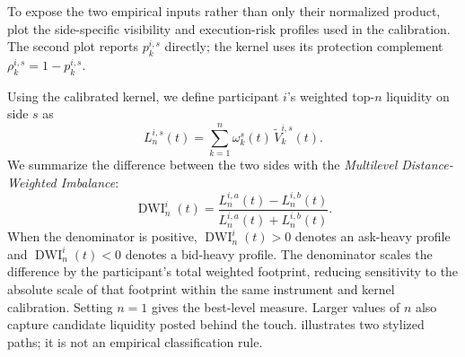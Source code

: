 \documentclass[11pt]{article}
\begin{document}
To expose the two empirical inputs rather than only their normalized product,
 plot the side-specific
visibility and execution-risk profiles used in the calibration. The second plot reports $p_k^{i,s}$ directly; the
kernel uses its protection complement $\rho_k^{i,s}=1-p_k^{i,s}$.


\FloatBarrier

Using the calibrated kernel, we define participant $i$'s weighted top-$n$ liquidity on side $s$ as
\begin{equation}
    L^{i,s}_{n}(t)
    =
    \sum_{k=1}^{n}
    \omega^{s}_{k}(t)\,\widetilde V^{i,s}_{k}(t).
    \label{eq:weighted_topn_liquidity}
\end{equation}
We summarize the difference between the two sides with the \textit{Multilevel Distance-Weighted Imbalance}:
\begin{equation}
    \operatorname{DWI}^{i}_{n}(t)
    =
    \frac{
        L^{i,a}_{n}(t)-L^{i,b}_{n}(t)
    }{
        L^{i,a}_{n}(t)+L^{i,b}_{n}(t)
    }.
    \label{eq:multilevel_dwi}
\end{equation}
When the denominator is positive, $\operatorname{DWI}^{i}_{n}(t)>0$ denotes an ask-heavy profile and
$\operatorname{DWI}^{i}_{n}(t)<0$ denotes a bid-heavy profile. The denominator scales the difference by the participant's
total weighted footprint, reducing sensitivity to the absolute scale of that footprint within the same instrument and
kernel calibration. Setting $n=1$ gives the best-level measure. Larger values of $n$ also capture candidate liquidity
posted behind the touch.  illustrates two stylized paths; it is not an empirical
classification rule.
\end{document}
